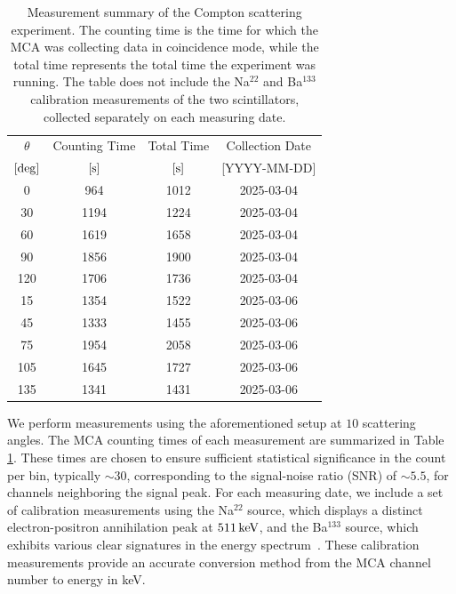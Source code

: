 \documentclass[aps,twocolumn,secnumarabic,balancelastpage,amsmath,amssymb,nofootinbib,floatfix]{revtex4-1}
\newcommand{\keV}{\,{\rm keV}}
\begin{document}
\begin{table}
    \centering
    \addtolength{\tabcolsep}{3pt}
    \def\arraystretch{1.2}
    \begin{tabular}{c c c c}
        \hline
        $\theta$ & Counting Time & Total Time & Collection Date \\ [0ex]
        $[\rm{deg}]$ & $[\rm{s}]$ & $[\rm{s}]$ & [YYYY-MM-DD] \\ [1ex]
        \hline\hline

        0 & 964 & 1012 & 2025-03-04 \\
        30 & 1194 & 1224 & 2025-03-04 \\
        60 & 1619 & 1658 & 2025-03-04 \\
        90 & 1856 & 1900 & 2025-03-04 \\
        120 & 1706 & 1736 & 2025-03-04 \\
        15 & 1354 & 1522 & 2025-03-06 \\
        45 & 1333 & 1455 & 2025-03-06 \\
        75 & 1954 & 2058 & 2025-03-06 \\
        105 & 1645 & 1727 & 2025-03-06 \\
        135 & 1341 & 1431 & 2025-03-06 \\
        
        \hline
        
    \end{tabular}
    \caption{Measurement summary of the Compton scattering experiment. The counting time is the time for which the MCA was collecting data in coincidence mode, while the total time represents the total time the experiment was running. The table does not include the Na$^{22}$ and Ba$^{133}$ calibration measurements of the two scintillators, collected separately on each measuring date.}
    \label{tab:data_collection}    
\end{table}

We perform measurements using the aforementioned setup at $10$ scattering angles. The MCA counting times of each measurement are summarized in Table \ref{tab:data_collection}. These times are chosen to ensure sufficient statistical significance in the count per bin, typically $\sim 30$, corresponding to the signal-noise ratio (SNR) of $\sim 5.5$, for channels neighboring the signal peak. For each measuring date, we include a set of calibration measurements using the Na$^{22}$ source, which displays a distinct electron-positron annihilation peak at $511\keV$, and the Ba$^{133}$ source, which exhibits various clear signatures in the energy spectrum~\citep{Heath1964,Amman2012}. These calibration measurements provide an accurate conversion method from the MCA channel number to energy in keV.
\end{document}
